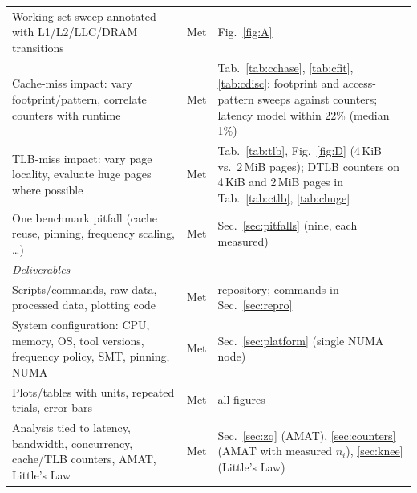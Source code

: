 \documentclass{article}
\begin{document}
{\begin{longtable}{p{6.0cm}p{1.6cm}p{8.0cm}}
Working-set sweep annotated with L1/L2/LLC/DRAM transitions & Met & Fig.~\ref{fig:A} \\
Cache-miss impact: vary footprint/pattern, correlate counters with runtime & Met & Tab.~\ref{tab:cchase}, \ref{tab:cfit}, \ref{tab:cdisc}: footprint and access-pattern sweeps against counters; latency model within 22\% (median 1\%) \\
TLB-miss impact: vary page locality, evaluate huge pages where possible & Met & Tab.~\ref{tab:tlb}, Fig.~\ref{fig:D} (4\,KiB vs.\ 2\,MiB pages); DTLB counters on 4\,KiB and 2\,MiB pages in Tab.~\ref{tab:ctlb}, \ref{tab:chuge} \\
One benchmark pitfall (cache reuse, pinning, frequency scaling, \ldots) & Met & Sec.~\ref{sec:pitfalls} (nine, each measured) \\
\midrule
\multicolumn{3}{l}{\textit{Deliverables}} \\
Scripts/commands, raw data, processed data, plotting code & Met & repository; commands in Sec.~\ref{sec:repro} \\
System configuration: CPU, memory, OS, tool versions, frequency policy, SMT, pinning, NUMA & Met & Sec.~\ref{sec:platform} (single NUMA node) \\
Plots/tables with units, repeated trials, error bars & Met & all figures \\
Analysis tied to latency, bandwidth, concurrency, cache/TLB counters, AMAT, Little's Law & Met & Sec.~\ref{sec:zq} (AMAT), \ref{sec:counters} (AMAT with measured $n_i$), \ref{sec:knee} (Little's Law) \\
\bottomrule
\end{longtable}
}
\end{document}
